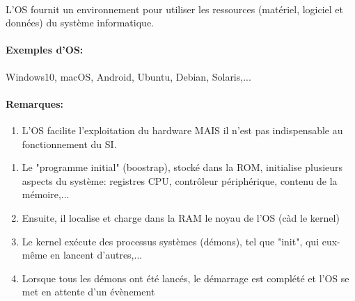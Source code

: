 {\paragraph{}
L'OS fournit un environnement pour utiliser les ressources (matériel, logiciel et données) du système informatique.

\paragraph{Exemples d'OS: } Windows10, macOS, Android, Ubuntu, Debian, Solaris,...

\paragraph{Remarques:}
\begin{enumerate}
\item L'OS facilite l'exploitation du hardware MAIS il n'est pas indispensable au fonctionnement du SI.
\end{enumerate}
}


\item{}
{
\begin{enumerate}
\item Le "programme initial" (boostrap), stocké dans la ROM, initialise plusieurs aspects du système: registres CPU, contrôleur périphérique, contenu de la mémoire,...
\item Ensuite, il localise et charge dans la RAM le noyau de l'OS (càd le kernel)
\item Le kernel exécute des processus systèmes (démons), tel que "init", qui eux-même en lancent d'autres,...
\item Lorsque tous les démons ont été lancés, le démarrage est complété et l'OS se met en attente d'un évènement
\end{enumerate}
}


